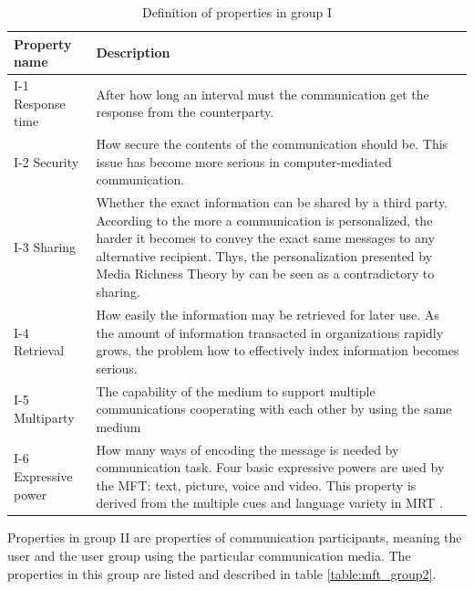 \documentclass[english,12pt,a4paper,pdftex]{article}
\begin{document}
\begin{table}[!h]
\renewcommand{\arraystretch}{1.3}
\caption{Definition of properties in group I}
\label{table:mft_group1}
\centering
\begin{tabular}{|p{4cm}|p{10cm}|}
\hline
\textbf{Property name} & \textbf{Description}\\
\hline
I-1 Response time & After how long an interval must the communication get the response from the counterparty. \\
\hline
I-2 Security & How secure the contents of the communication should be. This issue has become more serious in computer-mediated communication. \\
\hline
I-3 Sharing & Whether the exact information can be shared by a third party. According to \citet{higa2007} the more a communication is personalized, the harder it becomes to convey the exact same messages to any alternative recipient. Thys, the personalization presented by Media Richness Theory by \citet{daft1986} can be seen as a contradictory to sharing. \\
\hline
I-4 Retrieval & How easily the information may be retrieved for later use. As the amount of information transacted in organizations rapidly grows, the problem how to effectively index information becomes serious. \\
\hline
I-5 Multiparty & The capability of the medium to support multiple communications cooperating with each other by using the same medium \\
\hline
I-6 Expressive power & How many ways of encoding the message is needed by communication task. Four basic expressive powers are used by the MFT: text, picture, voice and video. This property is derived from the multiple cues and language variety in MRT \citep{daft1986}. \\
\hline
\end{tabular}
\end{table}

Properties in group II are properties of communication participants, meaning the user and the user group using the particular communication media. The properties in this group are listed and described in table \ref{table:mft_group2}.
\end{document}
